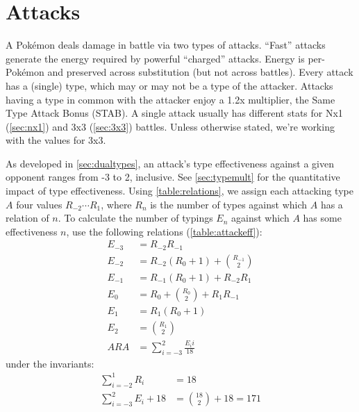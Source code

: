 \chapter{Attacks\label{chap:attacks}}
A Pokémon deals damage in battle via two types of attacks.
``Fast'' attacks generate the energy required by powerful ``charged'' attacks.
Energy is per-Pokémon and preserved across substitution (but not across battles).
Every attack has a (single) type, which may or may not be a type of the attacker.
Attacks having a type in common with the attacker enjoy a 1.2x multiplier, the Same Type Attack Bonus (STAB).
A single attack usually has different stats for Nx1 (\autoref{sec:nx1})
  and 3x3 (\autoref{sec:3x3}) battles.
Unless otherwise stated, we're working with the values for 3x3.

As developed in \autoref{sec:dualtypes}, an attack's type effectiveness
  against a given opponent ranges from -3 to 2, inclusive.
See \autoref{sec:typemult} for the quantitative impact of type effectiveness.
Using \autoref{table:relations}, we assign each attacking type $A$ four values
  $R_{-2}\cdots{}R_1$, where $R_n$ is the number of types against which $A$ has a
  relation of $n$.
To calculate the number of typings $E_n$ against which $A$ has some effectiveness $n$,
  use the following relations (\autoref{table:attackeff}):
\begin{align*}
  E_{-3} &= R_{-2}R_{-1}\\
  E_{-2} &= R_{-2}(R_0 + 1) + \binom{R_{-1}}{2}\\
  E_{-1} &= R_{-1}(R_0 + 1) + R_{-2}R_1\\
   E_{0} &= R_0 + \binom{R_0}{2} + R_{1}R_{-1}\\
   E_{1} &= R_{1}(R_0 + 1)\\
   E_{2} &= \binom{R_1}{2}\\
   ARA &= \sum_{i=-3}^{2} \frac{E_{i}i}{18}
\end{align*}
under the invariants:
\begin{align*}
    \sum_{i=-2}^{1} R_i &= 18\\
   \sum_{i=-3}^{2} E_i + 18 &= \binom{18}{2} + 18  = 171
\end{align*}
